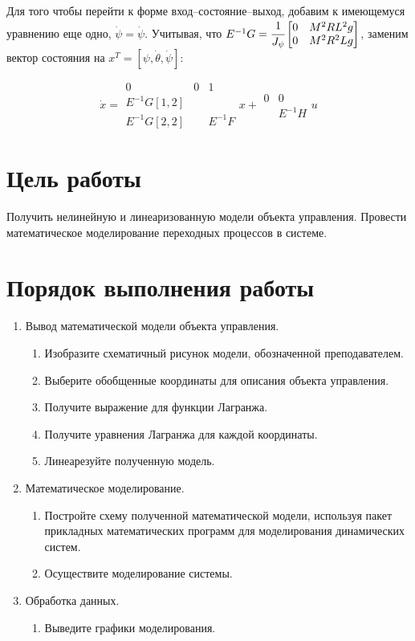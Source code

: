 \documentclass[12pt,a4paper,openany]{extarticle}
\begin{document}
Для того чтобы перейти к форме вход--состояние--выход, добавим к имеющемуся уравнению еще одно, $\dot\psi=\dot\psi$. Учитывая, что $E^{-1}G=\cfrac{1}{J_\psi}\begin{bmatrix} 0&M^2RL^2g\\0&M^2R^2Lg\\ \end{bmatrix}$, заменим вектор состояния на $x^T=[\psi, \dot\theta, \dot\psi]$:

\begin{equation}
\dot{x}=\begin{array}{|lcr|} 0&0&1\\ E^{-1}G[1,2]&&\\ E^{-1}G[2,2]&&E^{-1}F \end{array}x+\begin{array}{|lr|} 0&0\\ &E^{-1}H\end{array}u
\end{equation}

\section{Цель работы}
Получить нелинейную и линеаризованную модели объекта управления. Провести математическое моделирование переходных процессов в системе.

\section{Порядок выполнения работы}
\begin{enumerate}
	\item Вывод математической модели объекта управления.
	\begin{enumerate}
		\item Изобразите схематичный рисунок модели, обозначенной преподавателем.
		\item Выберите обобщенные координаты для описания объекта управления.
		\item Получите выражение для функции Лагранжа.
		\item Получите уравнения Лагранжа для каждой координаты.
		\item Линеарезуйте полученную модель.
	\end{enumerate}
	\item Математическое моделирование.
	\begin{enumerate}
		\item Постройте схему полученной математической модели, используя пакет прикладных математических программ для моделирования динамических систем.
		\item Осуществите моделирование системы.
	\end{enumerate}
	\item Обработка данных.
	\begin{enumerate}
		\item Выведите графики моделирования.
	\end{enumerate}
\end{enumerate}
\end{document}

